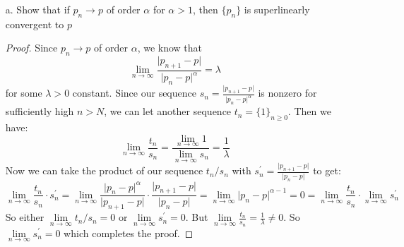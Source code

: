 \documentclass{article}
\begin{document}
    \begin{itemize}
        \item [a.] Show that if $p_{n} \rightarrow p$ of order $\alpha$ for $\alpha > 1$, then $\{p_{n}\}$ is superlinearly convergent to $p$
            \begin{proof}
                Since $p_{n} \rightarrow p$ of order $\alpha$, we know that
                    \begin{equation*}
                        \lim\limits_{n \to \infty} \dfrac{\lvert p_{n + 1} - p \rvert}{\lvert p_{n} - p \rvert^{\alpha}} = \lambda
                    \end{equation*}
                for some $\lambda > 0$ constant. Since our sequence $s_{n} = \frac{\lvert p_{n + 1} - p \rvert}{\lvert p_{n} - p \rvert^{\alpha}}$ is nonzero for sufficiently high $n > N$, we can let another sequence $t_{n} = \{1\}_{n \geq 0}$. Then we have:
                    \begin{equation*}
                        \lim\limits_{n \to \infty} \dfrac{t_{n}}{s_{n}} = \dfrac{\lim\limits_{n \to \infty} 1}{\lim\limits_{n \to \infty} s_{n}} = \dfrac{1}{\lambda}
                    \end{equation*}
                Now we can take the product of our sequence $t_{n} / s_{n}$ with $s^{\prime}_{n} = \frac{\lvert p_{n + 1} - p \rvert}{\lvert p_{n} - p \rvert}$ to get:
                    \begin{equation*}
                        \lim\limits_{n \to \infty} \dfrac{t_{n}}{s_{n}} \cdot s^{\prime}_{n} = \lim\limits_{n \to \infty} \dfrac{\lvert p_{n} - p \rvert^{\alpha}}{\lvert p_{n + 1} - p \rvert} \cdot \dfrac{\lvert p_{n + 1} - p \rvert}{\lvert p_{n} - p \rvert} = \lim\limits_{n \to \infty} \lvert p_{n} - p \rvert^{\alpha - 1} = 0 = \lim\limits_{n \to \infty} \dfrac{t_{n}}{s_{n}} \cdot \lim\limits_{n \to \infty} s^{\prime}_{n}
                    \end{equation*}
                So either $\lim\limits_{n \to \infty}t_{n} / s_{n} = 0$ or $\lim\limits_{n \to \infty} s^{\prime}_{n} = 0$. But $\lim\limits_{n \to \infty} \frac{t_{n}}{s_{n}} = \frac{1}{\lambda} \neq 0$. So $\lim\limits_{n \to \infty} s^{\prime}_{n} = 0$ which completes the proof.
            \end{proof}


\end{itemize}
\end{document}
